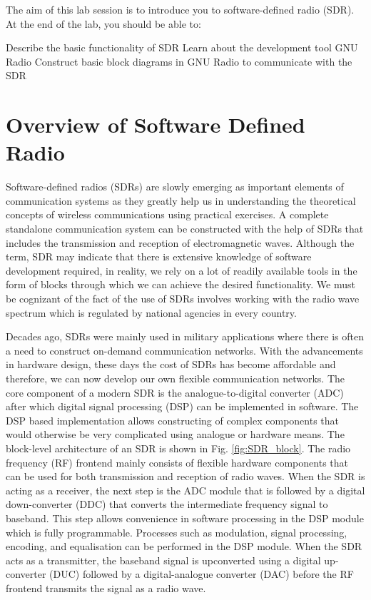\documentclass[11pt]{article}
\begin{document}
The aim of this lab session is to introduce you to software-defined radio (SDR). At the end of the lab, you should be able to:
\begin{outline}
  \1 Describe the basic functionality of SDR
  \1 Learn about the development tool GNU Radio
  \1 Construct basic block diagrams in GNU Radio to communicate with the SDR
\end{outline}


\section{Overview of Software Defined Radio}

Software-defined radios (SDRs) are slowly emerging as important elements of communication systems as they greatly help us in understanding the theoretical concepts of wireless communications using practical exercises. A complete standalone communication system can be constructed with the help of SDRs that includes the transmission and reception of electromagnetic waves. Although the term, SDR may indicate that there is extensive knowledge of software development required, in reality, we rely on a lot of readily available tools in the form of blocks through which we can achieve the desired functionality. We must be cognizant of the fact of the use of SDRs involves working with the radio wave spectrum which is regulated by national agencies in every country. 

Decades ago, SDRs were mainly used in military applications where there is often a need to construct on-demand communication networks. With the advancements in hardware design, these days the cost of SDRs has become affordable and therefore, we can now develop our own flexible communication networks. The core component of a modern SDR is the analogue-to-digital converter (ADC) after which digital signal processing (DSP) can be implemented in software. The DSP based implementation allows constructing of complex components that would otherwise be very complicated using analogue or hardware means. The block-level architecture of an SDR is shown in Fig. \ref{fig:SDR_block}. The radio frequency (RF) frontend mainly consists of flexible hardware components that can be used for both transmission and reception of radio waves. When the SDR is acting as a receiver, the next step is the ADC module that is followed by a digital down-converter (DDC) that converts the intermediate frequency signal to baseband. This step allows convenience in software processing in the DSP module which is fully programmable. Processes such as modulation, signal processing, encoding, and equalisation can be performed in the DSP module. When the SDR acts as a transmitter, the baseband signal is upconverted using a digital up-converter (DUC) followed by a digital-analogue converter (DAC) before the RF frontend transmits the signal as a radio wave.
\end{document}
